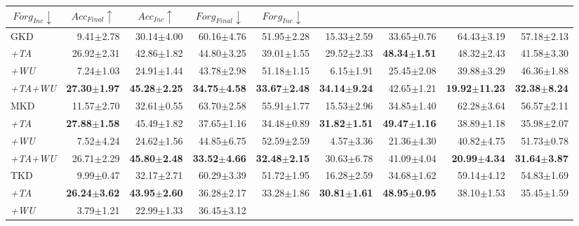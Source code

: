 \begin{appendix}
\begin{table*}
{\begin{tabular}{@{}lrrrrrrrr@{}}
  \multicolumn{1}{c}{$Forg_{Inc} \downarrow$} &
  \multicolumn{1}{c}{$Acc_{Final} \uparrow$} &
  \multicolumn{1}{c}{$Acc_{Inc} \uparrow$} &
  \multicolumn{1}{c}{$Forg_{Final} \downarrow$} &
  \multicolumn{1}{c}{$Forg_{Inc} \downarrow$} \\ \midrule
GKD &
  9.41$\pm$2.78 &
  30.14$\pm$4.00 &
  60.16$\pm$4.76 &
  51.95$\pm$2.28 &
  15.33$\pm$2.59 &
  33.65$\pm$0.76 &
  64.43$\pm$3.19 &
  57.18$\pm$2.13 \\
\textit{+TA} &
  26.92$\pm$2.31 &
  42.86$\pm$1.82 &
  44.80$\pm$3.25 &
  39.01$\pm$1.55 &
  29.52$\pm$2.33 &
  \textbf{48.34$\pm$1.51} &
  48.32$\pm$2.43 &
  41.58$\pm$3.30 \\
\textit{+WU} &
  7.24$\pm$1.03 &
  24.91$\pm$1.44 &
  43.78$\pm$2.98 &
  51.18$\pm$1.15 &
  6.15$\pm$1.91 &
  25.45$\pm$2.08 &
  39.88$\pm$3.29 &
  46.36$\pm$1.88 \\
\textit{+TA+WU} &
  \textbf{27.30$\pm$1.97} &
  \textbf{45.28$\pm$2.25} &
  \textbf{34.75$\pm$4.58} &
  \textbf{33.67$\pm$2.48} &
  \textbf{34.14$\pm$9.24} &
  42.65$\pm$1.21 &
  \textbf{19.92$\pm$11.23} &
  \textbf{32.38$\pm$8.24} \\ \midrule
MKD &
  11.57$\pm$2.70 &
  32.61$\pm$0.55 &
  63.70$\pm$2.58 &
  55.91$\pm$1.77 &
  15.53$\pm$2.96 &
  34.85$\pm$1.40 &
  62.28$\pm$3.64 &
  56.57$\pm$2.11 \\
\textit{+TA} &
  \textbf{27.88$\pm$1.58} &
  45.49$\pm$1.82 &
  37.65$\pm$1.16 &
  34.48$\pm$0.89 &
  \textbf{31.82$\pm$1.51} &
  \textbf{49.47$\pm$1.16} &
  38.89$\pm$1.18 &
  35.98$\pm$2.07 \\
\textit{+WU} &
  7.52$\pm$4.24 &
  24.62$\pm$1.56 &
  44.85$\pm$6.75 &
  52.59$\pm$2.59 &
  4.57$\pm$3.36 &
  21.36$\pm$4.30 &
  40.82$\pm$4.75 &
  51.73$\pm$0.78 \\
\textit{+TA+WU} &
  26.71$\pm$2.29 &
  \textbf{45.80$\pm$2.48} &
  \textbf{33.52$\pm$4.66} &
  \textbf{32.48$\pm$2.15} &
  30.63$\pm$6.78 &
  41.09$\pm$4.04 &
  \textbf{20.99$\pm$4.34} &
  \textbf{31.64$\pm$3.87} \\ \midrule
TKD &
  9.99$\pm$0.47 &
  32.17$\pm$2.71 &
  60.29$\pm$3.39 &
  51.72$\pm$1.95 &
  16.28$\pm$2.59 &
  34.68$\pm$1.62 &
  59.14$\pm$4.12 &
  54.83$\pm$1.69 \\
\textit{+TA} &
  \textbf{26.24$\pm$3.62} &
  \textbf{43.95$\pm$2.60} &
  36.28$\pm$2.17 &
  33.28$\pm$1.86 &
  \textbf{30.81$\pm$1.61} &
  \textbf{48.95$\pm$0.95} &
  38.10$\pm$1.53 &
  35.45$\pm$1.59 \\
\textit{+WU} &
  3.79$\pm$1.21 &
  22.99$\pm$1.33 &
  36.45$\pm$3.12 &

\end{tabular}}
\end{table*}
\end{appendix}
